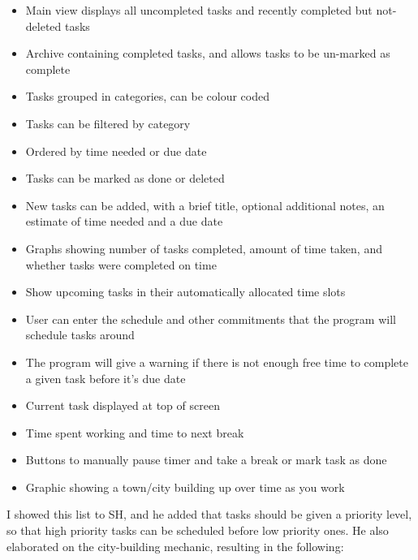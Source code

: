 \documentclass{article}
\begin{document}
\begin{itemize}
	\item Main view displays all uncompleted tasks and recently completed but
	      not-deleted tasks
	\item Archive containing completed tasks, and allows tasks to be un-marked as
	      complete
	\item Tasks grouped in categories, can be colour coded
	\item Tasks can be filtered by category
	\item Ordered by time needed or due date
	\item Tasks can be marked as done or deleted
	\item New tasks can be added, with a brief title, optional additional notes, an
	      estimate of time needed and a due date
	\item Graphs showing number of tasks completed, amount of time taken, and
	      whether tasks were completed on time
	\item Show upcoming tasks in their automatically allocated time slots
	\item User can enter the schedule and other commitments that the program will
	      schedule tasks around
	\item The program will give a warning if there is not enough free time to
	      complete a given task before it's due date
	\item Current task displayed at top of screen
	\item Time spent working and time to next break
	\item Buttons to manually pause timer and take a break or mark task as done
	\item Graphic showing a town/city building up over time as you work
\end{itemize}

I showed this list to SH, and he added that tasks should be given a priority
level, so that high priority tasks can be scheduled before low priority ones. He
also elaborated on the city-building mechanic, resulting in the following:
\end{document}
